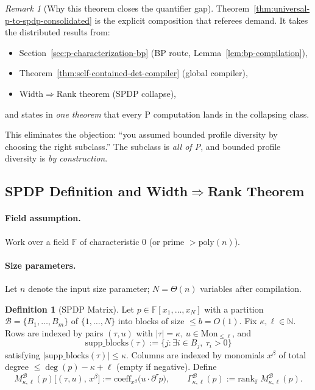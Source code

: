 \documentclass[12pt]{article}
\theoremstyle{definition}
\newtheorem{definition}{Definition}
\theoremstyle{definition}
\theoremstyle{remark}
\newtheorem{remark}{Remark}
\theoremstyle{remark}
\begin{document}
\begin{remark}[Why this theorem closes the quantifier gap]
Theorem~\ref{thm:universal-p-to-spdp-consolidated} is the explicit composition that
referees demand. It takes the distributed results from:
\begin{itemize}
\item Section~\ref{sec:p-characterization-bp} (BP route, Lemma~\ref{lem:bp-compilation}),
\item Theorem~\ref{thm:self-contained-det-compiler} (global compiler),
\item Width$\Rightarrow$Rank theorem (SPDP collapse),
\end{itemize}
and states in \emph{one theorem} that every P computation lands in the collapsing class.

This eliminates the objection: ``you assumed bounded profile diversity by choosing the right subclass.''
The subclass is \emph{all of P}, and bounded profile diversity is \emph{by construction}.
\end{remark}

\subsection{SPDP Definition and Width$\Rightarrow$Rank Theorem}

\paragraph{Field assumption.}
Work over a field $\mathbb{F}$ of characteristic $0$ (or prime $> \mathrm{poly}(n)$).

\paragraph{Size parameters.}
Let $n$ denote the input size parameter; $N = \Theta(n)$ variables after compilation.

\begin{definition}[SPDP Matrix]
Let $p\in\mathbb{F}[x_1,\ldots,x_N]$ with a partition $\mathcal{B}=\{B_1,\ldots,B_m\}$ of $\{1,\ldots,N\}$ into blocks of size $\le b=O(1)$.
Fix $\kappa,\ell\in\mathbb{N}$. Rows are indexed by pairs $(\tau,u)$ with $|\tau|=\kappa$, $u\in\mathrm{Mon}_{\le \ell}$, and
\[
\mathrm{supp\_blocks}(\tau):=\{j:\exists i\in B_j,\ \tau_i>0\}
\]
satisfying $|\mathrm{supp\_blocks}(\tau)|\le \kappa$.
Columns are indexed by monomials $x^\beta$ of total degree $\le \deg(p)-\kappa+\ell$ (empty if negative).
Define
\[
M_{\kappa,\ell}^{\mathcal{B}}(p)\big[(\tau,u),\,x^\beta\big] := \mathrm{coeff}_{x^\beta}\!\big(u\cdot \partial^\tau p\big),
\qquad
\Gamma_{\kappa,\ell}^{\mathcal{B}}(p):=\mathrm{rank}_{\mathbb{F}}\,M_{\kappa,\ell}^{\mathcal{B}}(p).
\]
\end{definition}
\end{document}
